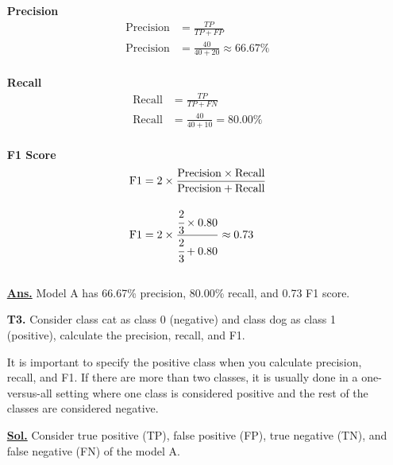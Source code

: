 \documentclass[12pt, a4paper]{article}
\newcommand{\sol}{\par\noindent\underline{\textbf{Sol.}} }
\newcommand{\ans}{\par\noindent\underline{\textbf{Ans.}} }
\begin{document}
\begin{enumerate}
            \noindent
            \begin{minipage}{0.5\textwidth}
                \centering
                \textbf{Precision}
                \begin{align*}
                    \text{Precision} &= \frac{TP}{TP + FP} \\[1em]
                    \text{Precision} &= \frac{40}{40 + 20} \approx 66.67\% \\[1em]
                \end{align*}
            \end{minipage}%
            \hfill
            \begin{minipage}{0.5\textwidth}
                \centering
                \textbf{Recall}
                \begin{align*}
                    \text{Recall} &= \frac{TP}{TP + FN} \\[1em]
                    \text{Recall} &= \frac{40}{40 + 10} = 80.00\% \\[1em]
                \end{align*}
            \end{minipage}
            \begin{minipage}{0.5\textwidth}
                \centering
                \textbf{F1 Score}
                \begin{align*}
                    \text{F1} &= 2 \times \frac{\text{Precision} \times \text{Recall}}{\text{Precision} + \text{Recall}} \\[1em]
                    \text{F1} &= 2 \times \frac{\cfrac{2}{3} \times 0.80}{\cfrac{2}{3} + 0.80} \approx 0.73 \\[1em]
                \end{align*}
            \end{minipage}
            \ans Model A has 66.67\% precision, 80.00\% recall, and 0.73 F1 score.
        \pagebreak

        \item[\textbf{T3.}] Consider class cat as class 0 (negative) and class dog as class 1 (positive), calculate the precision, recall, and F1.

        It is important to specify the positive class when you calculate precision, recall, and F1. If there are more than two classes, it is usually done in a one-versus-all setting where one class is considered positive and the rest of the classes are considered negative.

            \sol Consider true positive (TP), false positive (FP), true negative (TN), and false negative (FN) of the model A.


\end{enumerate}
\end{document}

